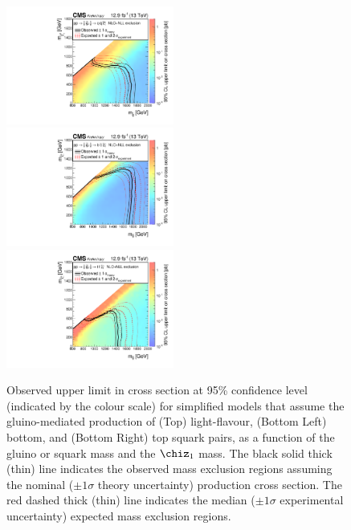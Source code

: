 \begin{figure}[thp!]
  \begin{center}
    \includegraphics[width=0.49\textwidth]{SUS16T1qqqqXSEC.pdf} \\
    \includegraphics[width=0.49\textwidth]{SUS16T1bbbbXSEC.pdf} ~
    \includegraphics[width=0.49\textwidth]{SUS16T1ttttXSEC.pdf} 
    \caption{Observed upper limit in cross section at 95\% confidence
      level (indicated by the colour scale) for simplified models that
      assume the gluino-mediated production of (Top) light-flavour,
      (Bottom Left) bottom, and (Bottom Right) top squark pairs, as a
      function of the gluino or squark mass and the $\chiz_{1}$
      mass. The black solid thick (thin) line indicates the observed
      mass exclusion regions assuming the nominal (${\pm}1 \sigma$
      theory uncertainty) production cross section. The red dashed
      thick (thin) line indicates the median (${\pm}1 \sigma$
      experimental uncertainty) expected mass exclusion
      regions. 
      \label{fig:limits-sms-gluino} }
  \end{center}
\end{figure}

